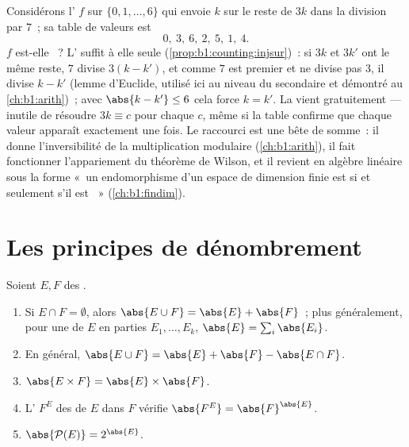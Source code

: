 \begin{example}\label{ex:b1:counting:mod7}
Considérons l' $f$ sur $\{0, 1, \dots, 6\}$ qui envoie $k$ sur
le reste de $3k$ dans la division par $7$~; sa table de valeurs est
\[
0,\ 3,\ 6,\ 2,\ 5,\ 1,\ 4 .
\]
$f$ est-elle ~? L' suffit à elle seule
(\cref{prop:b1:counting:injsur})~: si $3k$ et $3k'$ ont le même
reste, $7$ divise $3(k - k')$, et comme $7$ est premier et ne
divise pas $3$, il divise $k - k'$ (lemme d'Euclide, utilisé ici au
niveau du secondaire et démontré au \cref{ch:b1:arith})~; avec
$\abs{k - k'} \leq 6$ cela force $k = k'$. La  vient
gratuitement --- inutile de résoudre $3k \equiv c$ pour chaque $c$,
même si la table confirme que chaque valeur apparaît exactement une
fois. Le raccourci est une bête de somme~: il donne l'inversibilité
de la multiplication modulaire (\cref{ch:b1:arith}), il fait
fonctionner l'appariement du théorème de Wilson, et il revient en
algèbre linéaire sous la forme «~un endomorphisme d'un espace de
dimension finie est  si et seulement s'il est ~»
(\cref{ch:b1:findim}).
\end{example}

\section{Les principes de dénombrement}

\begin{proposition}\label{prop:b1:counting:rules}
Soient $E, F$ des .
\begin{enumerate}
  \item Si $E \cap F = \emptyset$, alors $\abs{E \cup F} = \abs{E} +
        \abs{F}$~; plus généralement, pour une  de $E$ en parties
        $E_1, \dots, E_k$, $\abs{E} = \sum_i \abs{E_i}$.
  \item En général, $\abs{E \cup F} = \abs{E} + \abs{F} - \abs{E \cap
        F}$.
  \item $\abs{E \times F} = \abs{E} \times \abs{F}$.
  \item L' $F^E$ des  de $E$ dans $F$ vérifie
        $\abs{F^E} = \abs{F}^{\abs{E}}$.
  \item $\abs{\mathcal{P}(E)} = 2^{\abs{E}}$.
\end{enumerate}
\end{proposition}

